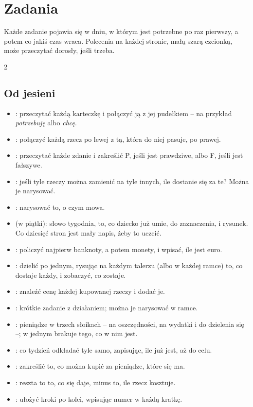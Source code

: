 \section*{Zadania}

Każde zadanie pojawia się w dniu, w którym jest potrzebne po raz
pierwszy, a potem co jakiś czas wraca. Polecenia na każdej stronie, małą
szarą czcionką, może przeczytać dorosły, jeśli trzeba.

{\small
\begin{multicols}{2}
\raggedright
\subsection*{Od jesieni}
\begin{itemize}[leftmargin=5mm, itemsep=1pt, topsep=0pt]
\item \textbf{\lblClasifica}: przeczytać każdą karteczkę i połączyć ją z
  jej pudełkiem -- na przykład \emph{potrzebuję} albo \emph{chcę}.
\item \textbf{\lblUne}: połączyć każdą rzecz po lewej z tą, która do
  niej pasuje, po prawej.
\item \textbf{\lblVF}: przeczytać każde zdanie i zakreślić P, jeśli jest
  prawdziwe, albo F, jeśli jest fałszywe.
\item \textbf{\lblTrueque}: jeśli tyle rzeczy można zamienić na tyle
  innych, ile dostanie się za te? Można je narysować.
\item \textbf{\lblDibuja}: narysować to, o czym mowa.
\item \textbf{\lblRepasa} (w piątki): słowo tygodnia, to, co dziecko już
  umie, do zaznaczenia, i rysunek. Co dziesięć stron jest mały napis, żeby
  to uczcić.
\item \textbf{\lblDinero}: policzyć najpierw banknoty, a potem monety, i
  wpisać, ile jest euro.
\item \textbf{\lblReparte}: dzielić po jednym, rysując na każdym talerzu
  (albo w każdej ramce) to, co dostaje każdy, i zobaczyć, co zostaje.
\item \textbf{\lblCompra}: znaleźć cenę każdej kupowanej rzeczy i dodać
  je.
\item \textbf{\lblProblema}: krótkie zadanie z działaniem; można je
  narysować w ramce.
\item \textbf{\lblBotes}: pieniądze w trzech słoikach -- na
  oszczędności, na wydatki i do dzielenia się --; w jednym brakuje tego,
  co w nim jest.
\item \textbf{\lblHucha}: co tydzień odkładać tyle samo, zapisując, ile
  już jest, aż do celu.
\item \textbf{\lblLlega}: zakreślić to, co można kupić za pieniądze,
  które się ma.
\item \textbf{\lblVuelta}: reszta to to, co się daje, minus to, ile
  rzecz kosztuje.
\item \textbf{\lblOrdena}: ułożyć kroki po kolei, wpisując numer w każdą
  kratkę.
\end{itemize}

\end{multicols}}

